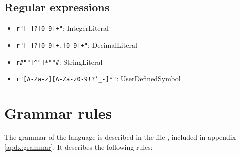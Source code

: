 \documentclass[11pt]{scrreprt}
\begin{document}
\subsection{Regular expressions}
\begin{itemize}
  \item \texttt{r"[-]?[0-9]+"}: IntegerLiteral
  \item \texttt{r"[-]?[0-9]+.[0-9]+"}: DecimalLiteral
  \item \texttt{r\#""[\^{}"]*""\#}: StringLiteral
  \item \texttt{r"[A-Za-z][A-Za-z0-9!?'\_-]*"}: UserDefinedSymbol
\end{itemize}

\section{Grammar rules}
The grammar of the language is described in the file , included in appendix \ref{apdx:grammar}. It describes the following rules:
\end{document}
